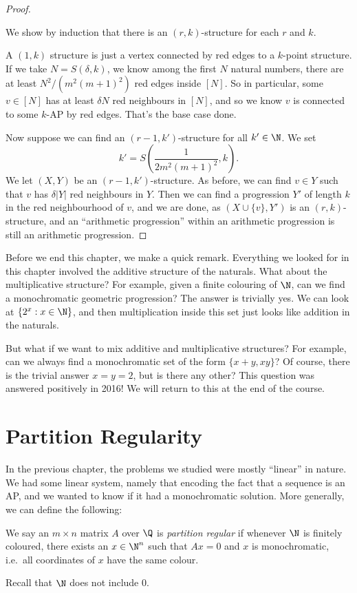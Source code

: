 \documentclass[a4paper]{article}
\begin{document}
\begin{proof}
\begin{center}
\begin{tikzpicture}
    \end{tikzpicture}
  \end{center}
  We show by induction that there is an $(r, k)$-structure for each $r$ and $k$.

  A $(1, k)$ structure is just a vertex connected by red edges to a $k$-point structure. If we take $N = S(\delta, k)$, we know among the first $N$ natural numbers, there are at least $N^2/(m^2(m + 1)^2)$ red edges inside $[N]$. So in particular, some $v \in [N]$ has at least $\delta N$ red neighbours in $[N]$, and so we know $v$ is connected to some $k$-AP by red edges. That's the base case done.

  Now suppose we can find an $(r - 1, k')$-structure for all $k' \in \N$. We set
  \[
    k' = S\left(\frac{1}{2m^2(m + 1)^2}, k\right).
  \]
  We let $(X, Y)$ be an $(r - 1, k')$-structure. As before, we can find $v \in Y$ such that $v$ has $\delta|Y|$ red neighbours in $Y$. Then we can find a progression $Y'$ of length $k$ in the red neighbourhood of $v$, and we are done, as $(X \cup \{v\}, Y')$ is an $(r, k)$-structure, and an ``arithmetic progression'' within an arithmetic progression is still an arithmetic progression.
\end{proof}
Before we end this chapter, we make a quick remark. Everything we looked for in this chapter involved the additive structure of the naturals. What about the multiplicative structure? For example, given a finite colouring of $\N$, can we find a monochromatic geometric progression? The answer is trivially yes. We can look at $\{2^x: x \in \N\}$, and then multiplication inside this set just looks like addition in the naturals.

But what if we want to mix additive and multiplicative structures? For example, can we always find a monochromatic set of the form $\{x + y, xy\}$? Of course, there is the trivial answer $x = y = 2$, but is there any other? This question was answered positively in 2016! We will return to this at the end of the course.

\section{Partition Regularity}
In the previous chapter, the problems we studied were mostly ``linear'' in nature. We had some linear system, namely that encoding the fact that a sequence is an AP, and we wanted to know if it had a monochromatic solution. More generally, we can define the following:

\begin{defi}
  We say an $m \times n$ matrix $A$ over $\Q$ is \emph{partition regular} if whenever $\N$ is finitely coloured, there exists an $x \in \N^n$ such that $Ax = 0$ and $x$ is monochromatic, i.e.\ all coordinates of $x$ have the same colour.
\end{defi}
Recall that $\N$ does not include $0$.
\end{document}
